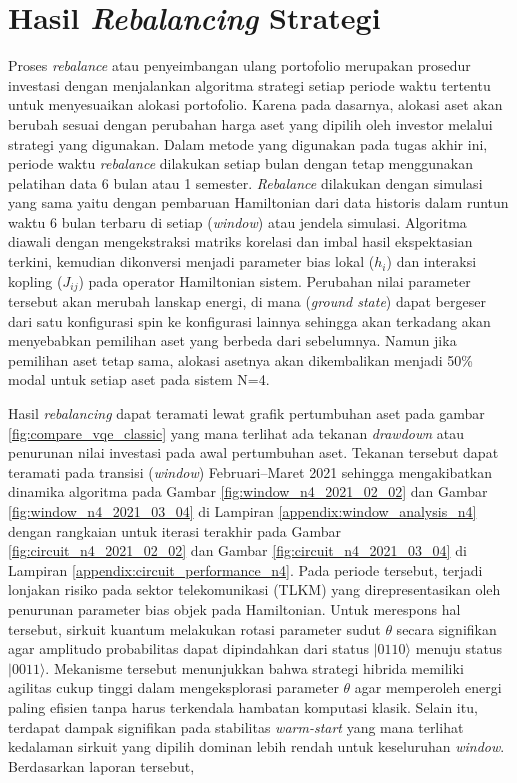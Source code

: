 \section{Hasil \textit{Rebalancing} Strategi}
\label{sec:4_11_window_analysis}

Proses \textit{rebalance} atau penyeimbangan ulang portofolio merupakan prosedur investasi dengan menjalankan algoritma strategi setiap periode waktu tertentu untuk menyesuaikan alokasi portofolio. Karena pada dasarnya, alokasi aset akan berubah sesuai dengan perubahan harga aset yang dipilih oleh investor melalui strategi yang digunakan. Dalam metode yang digunakan pada tugas akhir ini, periode waktu \textit{rebalance} dilakukan setiap bulan dengan tetap menggunakan pelatihan data 6 bulan atau 1 semester. \textit{Rebalance} dilakukan dengan simulasi yang sama yaitu dengan pembaruan Hamiltonian dari data historis dalam runtun waktu 6 bulan terbaru di setiap (\textit{window}) atau jendela simulasi. Algoritma diawali dengan mengekstraksi matriks korelasi dan imbal hasil ekspektasian terkini, kemudian dikonversi menjadi parameter bias lokal ($h_i$) dan interaksi kopling ($J_{ij}$) pada operator Hamiltonian sistem. Perubahan nilai parameter tersebut akan merubah lanskap energi, di mana (\textit{ground state}) dapat bergeser dari satu konfigurasi spin ke konfigurasi lainnya sehingga akan terkadang akan menyebabkan pemilihan aset yang berbeda dari sebelumnya. Namun jika pemilihan aset tetap sama, alokasi asetnya akan dikembalikan menjadi 50\% modal untuk setiap aset pada sistem N=4.

Hasil \textit{rebalancing} dapat teramati lewat grafik pertumbuhan aset pada gambar \ref{fig:compare_vqe_classic} yang mana terlihat ada tekanan \textit{drawdown} atau penurunan nilai investasi pada awal pertumbuhan aset. Tekanan tersebut dapat teramati pada transisi (\textit{window}) Februari--Maret 2021 sehingga mengakibatkan dinamika algoritma pada Gambar \ref{fig:window_n4_2021_02_02} dan Gambar \ref{fig:window_n4_2021_03_04} di Lampiran \ref{appendix:window_analysis_n4} dengan rangkaian untuk iterasi terakhir pada Gambar \ref{fig:circuit_n4_2021_02_02} dan Gambar \ref{fig:circuit_n4_2021_03_04} di Lampiran \ref{appendix:circuit_performance_n4}. Pada periode tersebut, terjadi lonjakan risiko pada sektor telekomunikasi (TLKM) yang direpresentasikan oleh penurunan parameter bias objek pada Hamiltonian. Untuk merespons hal tersebut, sirkuit kuantum melakukan rotasi parameter sudut $\theta$ secara signifikan agar amplitudo probabilitas dapat dipindahkan dari status $|0110\rangle$ menuju status $|0011\rangle$. Mekanisme tersebut menunjukkan bahwa strategi hibrida memiliki agilitas cukup tinggi dalam mengeksplorasi parameter $\theta$ agar memperoleh energi paling efisien tanpa harus terkendala hambatan komputasi klasik. Selain itu, terdapat dampak  signifikan pada stabilitas \textit{warm-start} yang mana terlihat kedalaman sirkuit yang dipilih dominan lebih rendah untuk keseluruhan \textit{window}. Berdasarkan laporan tersebut, 

